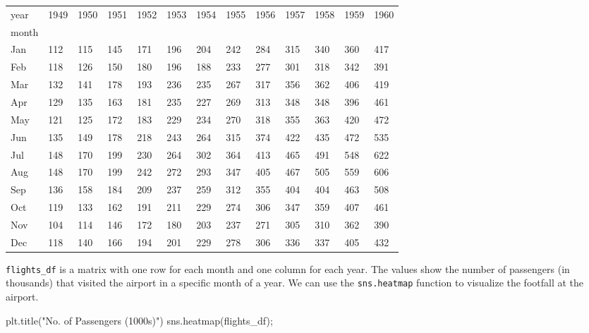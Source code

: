 \documentclass[
  letterpaper,
  DIV=11,
  numbers=noendperiod]{scrreprt}
\newenvironment{Shaded}{\begin{snugshade}}{\end{snugshade}}
\newcommand{\NormalTok}[1]{\textcolor[rgb]{0.00,0.23,0.31}{#1}}
\newcommand{\OperatorTok}[1]{\textcolor[rgb]{0.37,0.37,0.37}{#1}}
\newcommand{\StringTok}[1]{\textcolor[rgb]{0.13,0.47,0.30}{#1}}
\begin{document}
\begin{longtable}[]{@{}lllllllllllll@{}}
\toprule\noalign{}
year & 1949 & 1950 & 1951 & 1952 & 1953 & 1954 & 1955 & 1956 & 1957 &
1958 & 1959 & 1960 \\
month & & & & & & & & & & & & \\
\midrule\noalign{}
\endhead
\bottomrule\noalign{}
\endlastfoot
Jan & 112 & 115 & 145 & 171 & 196 & 204 & 242 & 284 & 315 & 340 & 360 &
417 \\
Feb & 118 & 126 & 150 & 180 & 196 & 188 & 233 & 277 & 301 & 318 & 342 &
391 \\
Mar & 132 & 141 & 178 & 193 & 236 & 235 & 267 & 317 & 356 & 362 & 406 &
419 \\
Apr & 129 & 135 & 163 & 181 & 235 & 227 & 269 & 313 & 348 & 348 & 396 &
461 \\
May & 121 & 125 & 172 & 183 & 229 & 234 & 270 & 318 & 355 & 363 & 420 &
472 \\
Jun & 135 & 149 & 178 & 218 & 243 & 264 & 315 & 374 & 422 & 435 & 472 &
535 \\
Jul & 148 & 170 & 199 & 230 & 264 & 302 & 364 & 413 & 465 & 491 & 548 &
622 \\
Aug & 148 & 170 & 199 & 242 & 272 & 293 & 347 & 405 & 467 & 505 & 559 &
606 \\
Sep & 136 & 158 & 184 & 209 & 237 & 259 & 312 & 355 & 404 & 404 & 463 &
508 \\
Oct & 119 & 133 & 162 & 191 & 211 & 229 & 274 & 306 & 347 & 359 & 407 &
461 \\
Nov & 104 & 114 & 146 & 172 & 180 & 203 & 237 & 271 & 305 & 310 & 362 &
390 \\
Dec & 118 & 140 & 166 & 194 & 201 & 229 & 278 & 306 & 336 & 337 & 405 &
432 \\
\end{longtable}

\texttt{flights\_df} is a matrix with one row for each month and one
column for each year. The values show the number of passengers (in
thousands) that visited the airport in a specific month of a year. We
can use the \texttt{sns.heatmap} function to visualize the footfall at
the airport.

\begin{Shaded}
\begin{Highlighting}[]
\NormalTok{plt.title(}\StringTok{"No. of Passengers (1000s)"}\NormalTok{)}
\NormalTok{sns.heatmap(flights\_df)}\OperatorTok{;}
\end{Highlighting}
\end{Shaded}
\end{document}

